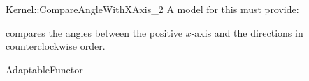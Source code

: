 \begin{ccRefFunctionObjectConcept}{Kernel::CompareAngleWithXAxis_2}
A model for this must provide:


 {compares
  the angles between the positive $x$-axis and the directions in
  counterclockwise order.}

\ccRefines
AdaptableFunctor

\end{ccRefFunctionObjectConcept}
